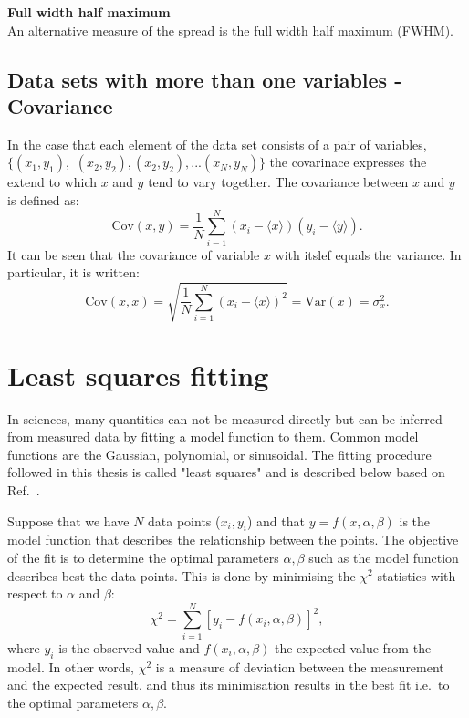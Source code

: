 
\normalsize{\textbf{Full width half maximum}}\\
An alternative measure of the spread is the full width half maximum (FWHM).


\subsection{Data sets with more than one variables - Covariance}
In the case that each element of the data set consists of a pair of variables, $\{(x_1, y_1),$ $(x_2, y_2), (x_2, y_2), ...(x_N, y_N)\}$ the covarinace expresses the extend to which $x$ and $y$ tend to vary together. The covariance between $x$ and $y$ is defined as:
\begin{equation}\label{eq:cov_def}
    \mathrm{Cov}(x, y) = \frac{1}{N} \sum_{i=1}^{N} (x_i-\langle x \rangle) (y_i-\langle y \rangle).
\end{equation}
It can be seen that the covariance of variable $x$ with itslef equals the variance. In particular, it is written:
\begin{equation}\label{eq:std_var_cov_relationship}
    \mathrm{Cov}(x, x) = \sqrt{\frac{1}{N} \sum_{i=1}^{N} (x_i-\langle x \rangle)^2} = \mathrm{Var}(x) = \sigma_x^2.
\end{equation}

\section{Least squares fitting}\label{app:non_linear_fitting}
In sciences, many quantities can not be measured directly but can be inferred from measured data by fitting a model function to them. Common model functions are the Gaussian, polynomial, or sinusoidal. The fitting procedure followed in this thesis is called "least squares" and is described below based on Ref.~\cite{least_square_minimisation}.

Suppose that we have $N$ data points ($x_{i}, y_{i}$) and that $y=f(x,\alpha, \beta)$ is the model function that describes the relationship between the points. The objective of the fit is to determine the optimal parameters $\alpha, \beta$ such as the model function describes best the data points. This is done by minimising the $\chi^2$ statistics with respect to $\alpha$ and $\beta$:
\begin{equation}\label{eq:chi_square}
    \chi^2 = \sum_{i=1}^{N}[y_{i}-f(x_{i},\alpha, \beta)]^2,
\end{equation}
where $y_{i}$ is the observed value and $f(x_{i},\alpha, \beta)$ the expected value from the model. In other words, $\chi^2$ is a measure of deviation between the measurement and the expected result, and thus its minimisation results in the best fit i.e.\ to the optimal parameters $\alpha, \beta$.



